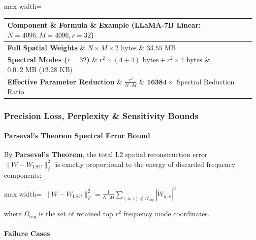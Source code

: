 \begin{center}
\begin{adjustbox}{max width=\columnwidth}
\renewcommand{\arraystretch}{1.2}
\begin{tabular}{lll}
\toprule
Component \& Formula \& Example (LLaMA-7B Linear: $N=4096, M=4096, r=32$) \\
\midrule
\textbf{Full Spatial Weights} \& $N \times M \times 2 \text{ bytes}$ \& $33.55 \text{ MB}$ \\
\textbf{Spectral Modes ($r=32$)} \& $r^2 \times (4 + 4) \text{ bytes} + r^2 \times 4 \text{ bytes}$ \& $0.012 \text{ MB}$ ($12.28 \text{ KB}$) \\
\textbf{Effective Parameter Reduction} \& $\frac{r^2}{N \cdot M}$ \& $\mathbf{16384\times}$ Spectral Reduction Ratio \\

\bottomrule
\end{tabular}
\end{adjustbox}
\end{center}

\subsubsection*{Precision Loss, Perplexity \& Sensitivity Bounds}

\paragraph{Parseval's Theorem Spectral Error Bound}

By \textbf{Parseval's Theorem}, the total L2 spatial reconstruction error $\| W - W_{\text{LSC}} \|_F^2$ is exactly proportional to the energy of discarded frequency components:

\begin{center}
\begin{adjustbox}{max width=\columnwidth}
$\displaystyle
\| W - W_{\text{LSC}} \|_F^2 = \frac{1}{N \cdot M} \sum_{(u, v) \notin \Omega_{\text{top}}} \left| \widetilde{W}_{u, v} \right|^2
$
\end{adjustbox}
\end{center}

where $\Omega_{\text{top}}$ is the set of retained top $r^2$ frequency mode coordinates.

\paragraph{Failure Cases}

